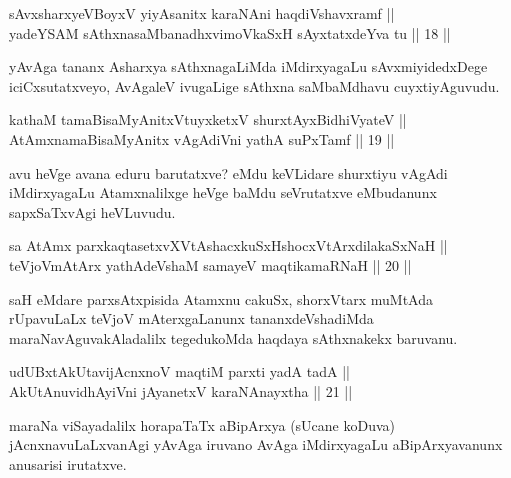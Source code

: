 \begin{shl}
sAvxsharxyeVBoyxV yiyAsanitx karaNAni haqdiVshavxramf || \\
yadeYSAM sAthxnasaMbanadhxvimoVkaSxH sAyxtatxdeYva tu \hfill || 18 ||
  
\end{shl}

\begin{artha}
yAvAga tananx Asharxya sAthxnagaLiMda iMdirxyagaLu sAvxmiyidedxDege
iciCxsutatxveyo, AvAgaleV ivugaLige sAthxna saMbaMdhavu cuyxtiyAguvudu.
\end{artha}

\begin{shl}
kathaM tamaBisaMyAnitxVtuyxketxV shurxtAyx\s BidhiVyateV || \\
AtAmxnamaBisaMyAnitx vAgAdiVni yathA suPxTamf \hfill || 19 ||
 
\end{shl}

\begin{artha}
avu heVge avana eduru barutatxve? eMdu keVLidare shurxtiyu vAgAdi
iMdirxyagaLu Atamxnalilxge heVge baMdu seVrutatxve eMbudanunx
sapxSaTxvAgi heVLuvudu.
\end{artha}


\begin{shl}
sa AtAmx parxkaqtasetxvXVtAshacxkuSxHshocxVtArxdilakaSxNaH ||  \\
teVjoVmAtArx yathAdeVshaM samayeV maqtikamaRNaH \hfill || 20 ||
  
\end{shl}

\begin{artha}
saH eMdare parxsAtxpisida Atamxnu cakuSx, shorxVtarx muMtAda
rUpavuLaLx teVjoV mAterxgaLanunx tananxdeVshadiMda
maraNavAguvakAladalilx tegedukoMda haqdaya sAthxnakekx baruvanu.
\end{artha}

\begin{shl}
udUBxtAkUtavijAcnxnoV maqtiM parxti yadA tadA || \\
AkUtAnuvidhAyiVni jAyanetxV karaNAnayxtha \hfill || 21 ||
  
\end{shl}

\begin{artha}
maraNa viSayadalilx horapaTaTx aBipArxya (sUcane koDuva)
jAcnxnavuLaLxvanAgi yAvAga iruvano AvAga iMdirxyagaLu
aBipArxyavanunx anusarisi irutatxve.
\end{artha}

